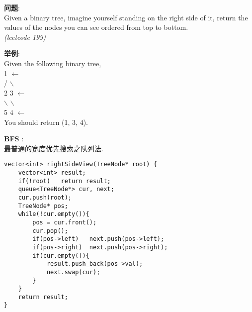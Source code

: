     
\begin{description}
    \item{\textbf{问题}}:\\
Given a binary tree, imagine yourself standing on the right side of it, return the values of the nodes you can see ordered from top to bottom.\\
\textit{(leetcode 199)}
    \item{\textbf{举例}}:\\
Given the following binary tree,\\
   1            $\leftarrow$   \\
 /   $\backslash$ \\
2     3     	$\leftarrow$   \\
 $\backslash$      $\backslash$	 \\
  5     4       $\leftarrow$   \\
You should return (1, 3, 4).
    \item{\textbf{BFS}} : 
    \\最普通的宽度优先搜索之队列法.
    \begin{lstlisting}
vector<int> rightSideView(TreeNode* root) {
	vector<int> result;
	if(!root)	return result;
	queue<TreeNode*> cur, next;
	cur.push(root);
	TreeNode* pos;
	while(!cur.empty()){
		pos = cur.front();
		cur.pop();
		if(pos->left)	next.push(pos->left);
		if(pos->right)	next.push(pos->right);
		if(cur.empty()){
			result.push_back(pos->val);
			next.swap(cur);
		}
	}
	return result;
}
    \end{lstlisting}
\end{description}
